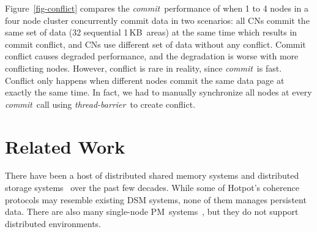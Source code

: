 \documentclass[sigconf]{acmart}
\newcommand{\KB}{\,KB}
\newcommand{\commitxact}{\textit{commit}}
\newcommand{\barrier}{\textit{thread-barrier}}
\newcommand{\dsnvm}{DSPM}
\newcommand{\nvm}{PM}
\newcommand{\hotpot}{Hotpot}
\newcommand{\xn}{CN}
\providecommand{\DIFdelbegin}{} %
\providecommand{\DIFdelend}{} %
\begin{document}
{
Figure~\ref{fig-conflict} compares the \commitxact\ performance of when 1 to 4 nodes in a four node cluster 
concurrently commit data in two scenarios:
all \xn{}s commit the same set of data (32 sequential 1\KB\ areas) at the same time which results in commit conflict,
and \xn{}s use different set of data without any conflict.
Commit conflict causes degraded performance, 
and the degradation is worse with more conflicting nodes.
However, conflict is rare in reality, since \commitxact\ is fast.
Conflict only happens when different nodes commit the same data page at exactly the same time.
In fact, we had to manually synchronize all nodes at every \commitxact\ call using \barrier\ to create conflict.

\DIFdelbegin %
\DIFdelend \section{Related Work}
\DIFdelbegin %
\DIFdelend \label{sec:related}

There have been a host of distributed shared memory systems and
distributed storage
systems~\cite{AdyaEtAl-Farsite,calder11-azure,DeCandia+07-Dynamo,Ghemawat03-GoogleFS,KubiEtAl00-Ocean,Petersen97-Bayou,Terry13-Pileus,Chun06-NSDI,Gibbons91-SPAA,Krieger90-HICSS,Zhang15-SOSP,Zhou92-IEEE,Stumm90-IEEE,Stumm90-IPDPS,HLRC,Shasta}
over the past few decades.
While some of \hotpot's coherence protocols may resemble existing DSM systems, none of them manages persistent data.
There are also many single-node \nvm\ systems~\cite{MemoryPersistency,pmxact-asplos16,Delegated-persist,sosp09:bpfs,Dragojevic14-NSDI,Dulloor14-EuroSys,Xiaojian11-SC,HiNFS-Eurosys16,Kamino-EuroSys17,Coburn11-ASPLOS,Volos11-ASPLOS},
but they do not support distributed environments.

}
\end{document}

